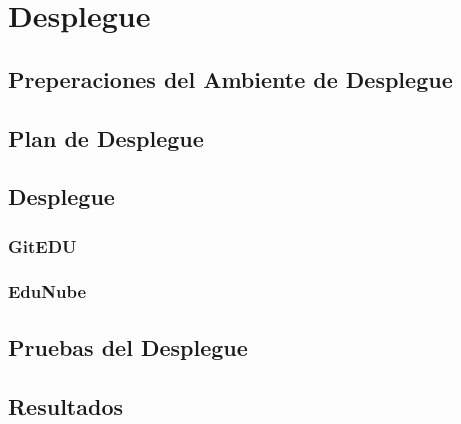 
\chapter{Desplegue}
\label{capitulo6}

\section{Preperaciones del Ambiente de Desplegue}

\section{Plan de Desplegue}

\section{Desplegue}

\subsection{GitEDU}

\subsection{EduNube}

\section{Pruebas del Desplegue}

\section{Resultados}

